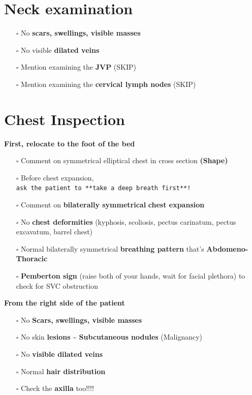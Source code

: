 \documentclass[
  13.5pt,
  a4paper,
  DIV=11,
  numbers=noendperiod]{scrreprt}
\providecommand{\tightlist}{%
  \setlength{\itemsep}{0pt}\setlength{\parskip}{0pt}}
\begin{document}
\section{Neck examination}\label{neck-examination}

\begin{itemize}
\tightlist
\item[$\square$]
  No \textbf{scars, swellings, visible masses}
\item[$\square$]
  No visible \textbf{dilated veins}
\item[$\square$]
  Mention examining the \textbf{JVP} (SKIP)
\item[$\square$]
  Mention examining the \textbf{cervical lymph nodes} (SKIP)
\end{itemize}

\section{Chest Inspection}\label{chest-inspection}

\textbf{First, relocate to the foot of the bed}

\begin{itemize}
\tightlist
\item[$\square$]
  Comment on symmetrical elliptical chest in cross section
  \textbf{(Shape)}
\item[$\square$]
  Before chest expansion,
  \texttt{ask\ the\ patient\ to\ **take\ a\ deep\ breath\ first**!}
\item[$\square$]
  Comment on \textbf{bilaterally symmetrical} \textbf{chest expansion}
\item[$\square$]
  No \textbf{chest deformities} (kyphosis, scoliosis, pectus carinatum,
  pectus excavatum, barrel chest)
\item[$\square$]
  Normal bilaterally symmetrical \textbf{breathing pattern} that's
  \textbf{Abdomeno-Thoracic}
\item[$\square$]
  \textbf{Pemberton sign} (raise both of your hands, wait for facial
  plethora) to check for SVC obstruction
\end{itemize}

\textbf{From the right side of the patient}

\begin{itemize}
\tightlist
\item[$\square$]
  No \textbf{Scars, swellings, visible masses}
\item[$\square$]
  No skin \textbf{lesions} \textasciitilde{} \textbf{Subcutaneous
  nodules} (Malignancy)
\item[$\square$]
  No \textbf{visible dilated veins}
\item[$\square$]
  Normal \textbf{hair distribution}
\item[$\square$]
  Check the \textbf{axilla} too!!!!
\end{itemize}
\end{document}
